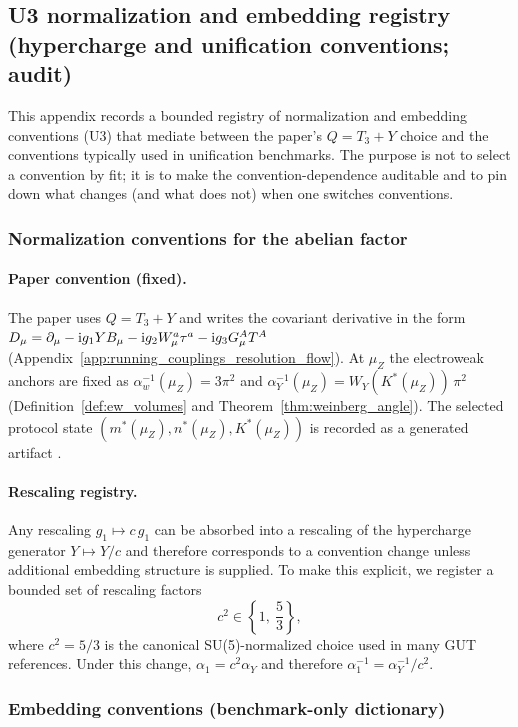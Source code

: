\subsection{U3 normalization and embedding registry (hypercharge and unification conventions; audit)}
\label{app:u3_normalization_embedding_registry}

This appendix records a bounded registry of normalization and embedding conventions (U3) that mediate between the paper's $Q=T_3+Y$ choice and the conventions typically used in unification benchmarks.
The purpose is not to select a convention by fit; it is to make the convention-dependence auditable and to pin down what changes (and what does not) when one switches conventions.

\subsubsection{Normalization conventions for the abelian factor}
\paragraph{Paper convention (fixed).}
\InterfaceTag The paper uses $Q=T_3+Y$ and writes the covariant derivative in the form
$D_\mu=\partial_\mu-\mathrm{i} g_1 Y B_\mu-\mathrm{i} g_2 W_\mu^a\tau^a-\mathrm{i} g_3 G_\mu^A T^A$
(Appendix~\ref{app:running_couplings_resolution_flow}).
At $\mu_Z$ the electroweak anchors are fixed as
$\alpha_w^{-1}(\mu_Z)=3\pi^2$ and $\alpha_Y^{-1}(\mu_Z)=W_Y(K^\ast(\mu_Z))\,\pi^2$ (Definition~\ref{def:ew_volumes} and Theorem~\ref{thm:weinberg_angle}).
The selected protocol state $(m^\ast(\mu_Z),n^\ast(\mu_Z),K^\ast(\mu_Z))$ is recorded as a generated artifact .

\paragraph{Rescaling registry.}
\AuditTag Any rescaling $g_1\mapsto c\,g_1$ can be absorbed into a rescaling of the hypercharge generator $Y\mapsto Y/c$ and therefore corresponds to a convention change unless additional embedding structure is supplied.
To make this explicit, we register a bounded set of rescaling factors
\[
c^2\in\left\{1,\ \frac{5}{3}\right\},
\]
where $c^2=5/3$ is the canonical SU(5)-normalized choice used in many GUT references.
Under this change, $\alpha_1=c^2\alpha_Y$ and therefore $\alpha_1^{-1}=\alpha_Y^{-1}/c^2$.

\subsubsection{Embedding conventions (benchmark-only dictionary)}
